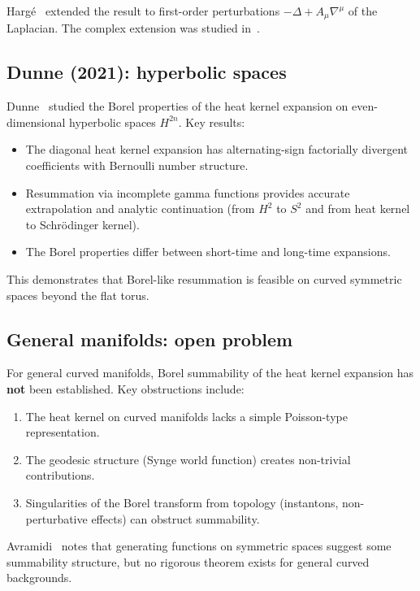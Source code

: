 \documentclass[11pt,a4paper]{article}
\begin{document}
Harg\'{e}~\cite{H13b} extended the result to first-order perturbations
$-\Delta + A_\mu\nabla^\mu$ of the Laplacian.  The complex extension
was studied in~\cite{H13c}.

\subsection{Dunne (2021): hyperbolic spaces}

Dunne~\cite{D21} studied the Borel properties of the heat kernel
expansion on even-dimensional hyperbolic spaces $H^{2n}$.  Key results:

\begin{itemize}
  \item The diagonal heat kernel expansion has alternating-sign factorially
    divergent coefficients with Bernoulli number structure.
  \item Resummation via incomplete gamma functions provides accurate
    extrapolation and analytic continuation (from $H^2$ to $S^2$ and from
    heat kernel to Schr\"{o}dinger kernel).
  \item The Borel properties differ between short-time and long-time
    expansions.
\end{itemize}

This demonstrates that Borel-like resummation is feasible on curved
symmetric spaces beyond the flat torus.

\subsection{General manifolds: open problem}

For general curved manifolds, Borel summability of the heat kernel
expansion has \textbf{not} been established.  Key obstructions include:

\begin{enumerate}
  \item The heat kernel on curved manifolds lacks a simple Poisson-type
    representation.
  \item The geodesic structure (Synge world function) creates non-trivial
    contributions.
  \item Singularities of the Borel transform from topology (instantons,
    non-perturbative effects) can obstruct summability.
\end{enumerate}

Avramidi~\cite{A00} notes that generating functions on symmetric spaces
suggest some summability structure, but no rigorous theorem exists for
general curved backgrounds.
\end{document}
